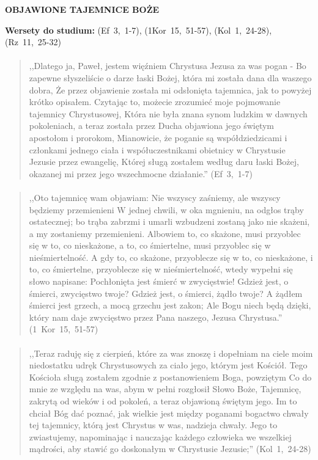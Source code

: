 \documentclass[10pt,a4paper,oneside]{article}
\begin{document}
\centerline{\textbf{\MakeUppercase{Objawione tajemnice Boże}}}
\begin{center}
\textbf{Wersety do studium:} 
\mbox{(Ef 3, 1-7)}, \mbox{(1Kor 15, 51-57)}, \mbox{(Kol 1, 24-28)}, \mbox{(Rz 11, 25-32)}
\end{center}
\paragraph{}
\begin{quote}
,,Dlatego ja, Paweł, jestem więźniem Chrystusa Jezusa za was pogan - Bo zapewne słyszeliście o darze łaski Bożej, która mi została dana dla waszego dobra, Że przez objawienie została mi odsłonięta tajemnica, jak to powyżej krótko opisałem. Czytając to, możecie zrozumieć moje pojmowanie tajemnicy Chrystusowej, Która nie była znana synom ludzkim w dawnych pokoleniach, a teraz została przez Ducha objawiona jego świętym apostołom i prorokom, Mianowicie, że poganie są współdziedzicami i członkami jednego ciała i współuczestnikami obietnicy w Chrystusie Jezusie przez ewangelię, Której sługą zostałem według daru łaski Bożej, okazanej mi przez jego wszechmocne działanie.'' \mbox{(Ef 3, 1-7)}
\end{quote}
\paragraph{}
\begin{quote}
,,Oto tajemnicę wam objawiam: Nie wszyscy zaśniemy, ale wszyscy będziemy przemienieni W jednej chwili, w oka mgnieniu, na odgłos trąby ostatecznej; bo trąba zabrzmi i umarli wzbudzeni zostaną jako nie skażeni, a my zostaniemy przemienieni. Albowiem to, co skażone, musi przyoblec się w to, co nieskażone, a to, co śmiertelne, musi przyoblec się w nieśmiertelność. A gdy to, co skażone, przyoblecze się w to, co nieskażone, i to, co śmiertelne, przyoblecze się w nieśmiertelność, wtedy wypełni się słowo napisane: Pochłonięta jest śmierć w zwycięstwie! Gdzież jest, o śmierci, zwycięstwo twoje? Gdzież jest, o śmierci, żądło twoje? A żądłem śmierci jest grzech, a mocą grzechu jest zakon; Ale Bogu niech będą dzięki, który nam daje zwycięstwo przez Pana naszego, Jezusa Chrystusa.'' \mbox{(1 Kor 15, 51-57)}
\end{quote}
\paragraph{}
\begin{quote}
,,Teraz raduję się z cierpień, które za was znoszę i dopełniam na ciele moim niedostatku udręk Chrystusowych za ciało jego, którym jest Kościół. Tego Kościoła sługą zostałem zgodnie z postanowieniem Boga, powziętym Co do mnie ze względu na was, abym w pełni rozgłosił Słowo Boże, Tajemnicę, zakrytą od wieków i od pokoleń, a teraz objawioną świętym jego. Im to chciał Bóg dać poznać, jak wielkie jest między poganami bogactwo chwały tej tajemnicy, którą jest Chrystus w was, nadzieja chwały. Jego to zwiastujemy, napominając i nauczając każdego człowieka we wszelkiej mądrości, aby stawić go doskonałym w Chrystusie Jezusie;'' \mbox{(Kol 1, 24-28)}
\end{quote}
\end{document}
